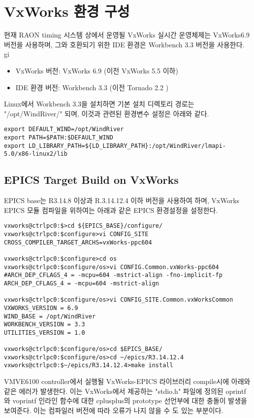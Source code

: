 \documentclass[11pt
  , a4paper
  , article
  , oneside
]{memoir}
\begin{document}
\chapter{VxWorks 환경 구성}
현재 RAON timing 시스템 상에서 운영될 VxWorks 실시간 운영체제는 VxWorks6.9 버전을 사용하며, 그와 호환되기 위한 IDE 환경은 Workbench 3.3 버전을 사용한다. gi


\begin{itemize}
	\item VxWorks 버전: VxWorks 6.9 (이전 VxWorks 5.5 이하)
	\item IDE 환경 버전: Workbench 3.3 (이전 Tornado 2.2 )
\end{itemize}

Linux에서 Workbench 3.3을 설치하면 기본 설치 디렉토리 경로는 "/opt/WindRiver/" 되며, 이것과 관련된 환경변수 설정은 아래와 같다.

\begin{lstlisting}[style=termstyle]
export DEFAULT_WIND=/opt/WindRiver
export PATH=$PATH:$DEFAULT_WIND
export LD_LIBRARY_PATH=${LD_LIBRARY_PATH}:/opt/WindRiver/lmapi-5.0/x86-linux2/lib
\end{lstlisting}

\section{EPICS Target Build on VxWorks}
EPICS base는 R3.14.8 이상과 R.3.14.12.4 이하 버전을 사용하여 하며, VxWorks EPICS 모듈 컴파일을 위하여는 아래과 같은 EPICS 환경설정을 설정한다.

\begin{lstlisting}[style=termstyle]
vxworks@ctrlpc0:$>cd ${EPICS_BASE}/configure/
vxworks@ctrlpc0:$configure>vi CONFIG_SITE
CROSS_COMPILER_TARGET_ARCHS=vxWorks-ppc604

vxworks@ctrlpc0:$configure>cd os
vxworks@ctrlpc0:$configure/os>vi CONFIG.Common.vxWorks-ppc604
#ARCH_DEP_CFLAGS_4 = -mcpu=604 -mstrict-align -fno-implicit-fp
ARCH_DEP_CFLAGS_4 = -mcpu=604 -mstrict-align

vxworks@ctrlpc0:$configure/os>vi CONFIG_SITE.Common.vxWorksCommon
VXWORKS_VERSION = 6.9
WIND_BASE = /opt/WindRiver
WORKBENCH_VERSION = 3.3
UTILITIES_VERSION = 1.0

vxworks@ctrlpc0:$configure/os>cd $EPICS_BASE/
vxworks@ctrlpc0:$configure/os>cd ~/epics/R3.14.12.4
vxworks@ctrlpc0:$~/epics/R3.14.12.4>make install
\end{lstlisting}

VMVE6100 controller에서 실행될 VxWorks-EPICS 라이브러리 compile시에 아래와 같은 에러가 발생한다. 이는 VxWorks에서 제공하는 "stdio.h" 파일에 정의된 oprintf와 voprintf 인라인 함수에 대한 cplusplus의 prototype 선언부에 대한 충돌이 발생을 보여준다. 이는 컴파일러 버전에 따라 오류가 나지 않을 수 도 있는 부분이다. 
\end{document}

